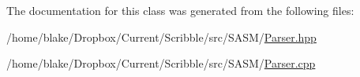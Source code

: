 The documentation for this class was generated from the following files\-:\begin{DoxyCompactItemize}
\item 
/home/blake/\-Dropbox/\-Current/\-Scribble/src/\-S\-A\-S\-M/\hyperlink{_s_a_s_m_2_parser_8hpp}{Parser.\-hpp}\item 
/home/blake/\-Dropbox/\-Current/\-Scribble/src/\-S\-A\-S\-M/\hyperlink{_s_a_s_m_2_parser_8cpp}{Parser.\-cpp}\end{DoxyCompactItemize}
